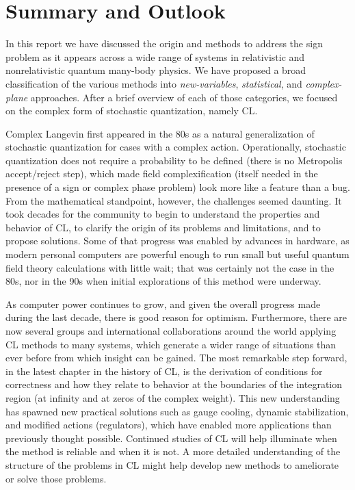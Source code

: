 \documentclass[../main.tex]{subfiles}
\begin{document}
\section{\label{sect:outlook}Summary and Outlook}

In this report we have discussed the origin and methods to address the sign problem as it appears across a wide range of
systems in relativistic and nonrelativistic quantum many-body physics. We have proposed a broad classification of the various methods into
{\it new-variables}, {\it statistical}, and {\it complex-plane} approaches. After a brief overview of each of those categories,
we focused on the complex form of stochastic quantization, namely CL.

Complex Langevin first appeared in the 80s as a natural generalization of stochastic quantization for cases with a complex action.
Operationally, stochastic quantization does not require a probability to be defined (there is no Metropolis accept/reject step), which made field
complexification (itself needed in the presence of a sign or complex phase problem) look more like a feature than a bug. From the
mathematical standpoint, however, the challenges seemed daunting. It took decades for the community to begin to understand the properties and
behavior of CL, to clarify the origin of its problems and limitations, and to propose solutions. Some of that progress was enabled by advances in
hardware, as modern personal computers are powerful enough to run small but useful quantum field theory calculations with little wait; %
that was certainly not the case in the 80s, nor in the 90s when initial explorations of this method were underway.

As computer power continues to grow, and given the overall progress made during the last decade, there is good reason for optimism.
Furthermore, there are now several groups and international collaborations around the world applying CL methods to many systems, which
generate a wider range of situations than ever before from which insight can be gained. The most remarkable step forward, in the latest chapter
in the history of CL, is the derivation of conditions for correctness and how they relate to behavior at the boundaries of the integration region (at
infinity and at zeros of the complex weight). This new understanding has spawned new practical solutions such as gauge cooling, dynamic
stabilization, and modified actions (regulators), which have enabled more applications than previously thought possible.
Continued studies of CL will help illuminate when the method is reliable and when it is not. A more detailed understanding of the structure of
the problems in CL might help develop new methods to ameliorate or solve those problems.
\end{document}
